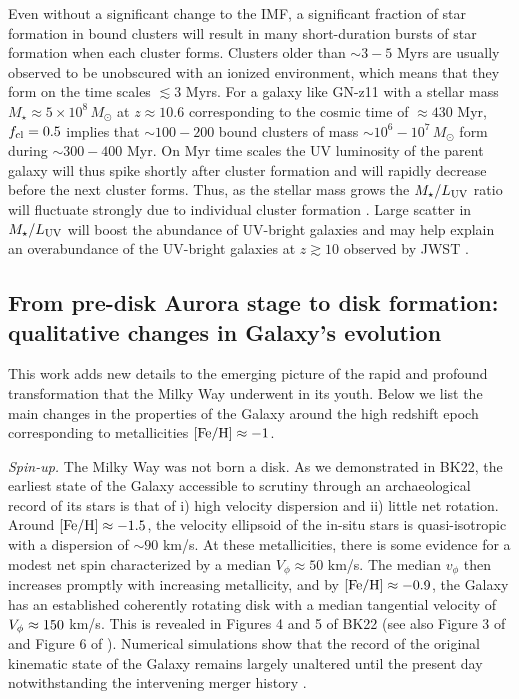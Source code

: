 \documentclass[a4paper,useAMS,usenatbib]{mnras}
\begin{document}
Even without a significant change to the IMF, a significant fraction of star formation in bound clusters will result in many short-duration bursts of star formation when each cluster forms. 
Clusters older than $\sim 3-5$ Myrs are usually observed to be unobscured with an ionized environment, which means that they form on the time scales $\lesssim 3$ Myrs. For a galaxy like GN-z11 with a stellar mass $M_\star\approx 5\times 10^8\, M_\odot$ at $z\approx 10.6$ corresponding to the cosmic time of $\approx 430$ Myr, $f_{\rm cl}=0.5$ implies that $\sim 100-200$ bound clusters of mass $\sim 10^6-10^7\, M_\odot$ form during $\sim 300-400$ Myr. On Myr time scales the UV luminosity of the parent galaxy will thus spike shortly after cluster formation and will rapidly decrease before the next cluster forms. Thus, as the stellar mass grows the $M_\star/L_{\rm UV}$ ratio will fluctuate strongly due to individual cluster formation \citep[see, e.g.,][for a case study of such process in the Fornax dwarf]{Zick.etal.2018}. 
Large scatter in $M_\star/L_{\rm UV}$ will boost the abundance of UV-bright galaxies and may help explain an overabundance of the UV-bright galaxies at $z\gtrsim 10$ observed by JWST \citep[e.g.,][]{Finkelstein.etal.2023,Wilkins.etal.2023,Yung.etal.2023}. 

\subsection{From pre-disk Aurora stage to disk formation: qualitative changes in Galaxy's evolution}

This work adds new details to the emerging picture of the rapid and profound transformation that the Milky Way underwent in its youth. Below we list the main changes in the properties of the Galaxy around the high redshift epoch corresponding to metallicities $\rm [Fe/H]\approx-1$.

{\it Spin-up.} The Milky Way was not born a disk. As we demonstrated in BK22, the earliest state of the Galaxy accessible to scrutiny through an archaeological record of its stars is that of i) high velocity dispersion and ii) little net rotation. Around $\rm [Fe/H]\approx-1.5$, the velocity ellipsoid of the in-situ stars is quasi-isotropic with a dispersion of ${\sim90}$ km/s. At these metallicities, there is some evidence for a modest net spin characterized by a median $V_{\phi}\approx50$ km/s. The median $v_\phi$ then increases promptly with increasing metallicity, and by $\rm[Fe/H]\approx-0.9$, the Galaxy has an established coherently rotating disk with a median tangential velocity of $V_{\rm \phi}\approx150$ km/s. This is revealed in Figures 4 and 5 of BK22 (see also Figure 3 of \citealt{Conroy2022} and Figure 6 of \citealt{Rix2022}). Numerical simulations show that the record of the original kinematic state of the Galaxy remains largely unaltered until the present day notwithstanding the intervening merger history \citep[see, e.g., BK22;][]{Mccluskey2023}.
\end{document}
